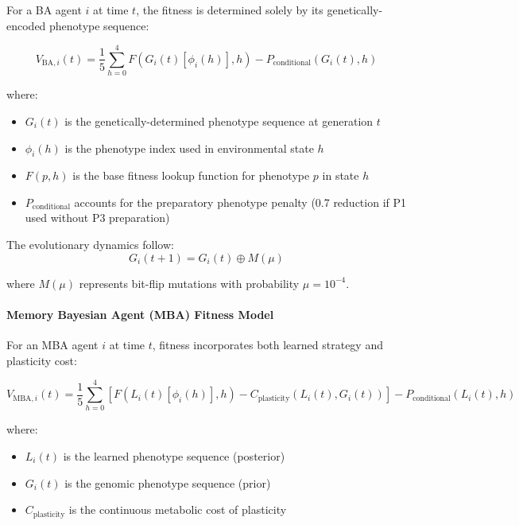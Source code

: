 \documentclass[aps,pre,twocolumn,floatfix,nofootinbib,amsmath,amssymb]{revtex4-2}
\begin{document}
For a BA agent $i$ at time $t$, the fitness is determined solely by its genetically-encoded phenotype sequence:

\begin{equation}
V_{\text{BA},i}(t) = \frac{1}{5} \sum_{h=0}^{4} F(G_i(t)[\phi_i(h)], h) - P_{\text{conditional}}(G_i(t), h)
\end{equation}

where:
\begin{itemize}
\item $G_i(t)$ is the genetically-determined phenotype sequence at generation $t$
\item $\phi_i(h)$ is the phenotype index used in environmental state $h$
\item $F(p,h)$ is the base fitness lookup function for phenotype $p$ in state $h$
\item $P_{\text{conditional}}$ accounts for the preparatory phenotype penalty (0.7 reduction if P1 used without P3 preparation)
\end{itemize}

The evolutionary dynamics follow:
\begin{equation}
G_i(t+1) = G_i(t) \oplus M(\mu)
\end{equation}

where $M(\mu)$ represents bit-flip mutations with probability $\mu = 10^{-4}$.

\paragraph{Memory Bayesian Agent (MBA) Fitness Model}

For an MBA agent $i$ at time $t$, fitness incorporates both learned strategy and plasticity cost:

\begin{equation}
V_{\text{MBA},i}(t) = \frac{1}{5} \sum_{h=0}^{4} [F(L_i(t)[\phi_i(h)], h) - C_{\text{plasticity}}(L_i(t), G_i(t))] - P_{\text{conditional}}(L_i(t), h)
\end{equation}

where:
\begin{itemize}
\item $L_i(t)$ is the learned phenotype sequence (posterior)
\item $G_i(t)$ is the genomic phenotype sequence (prior)
\item $C_{\text{plasticity}}$ is the continuous metabolic cost of plasticity
\end{itemize}
\end{document}
